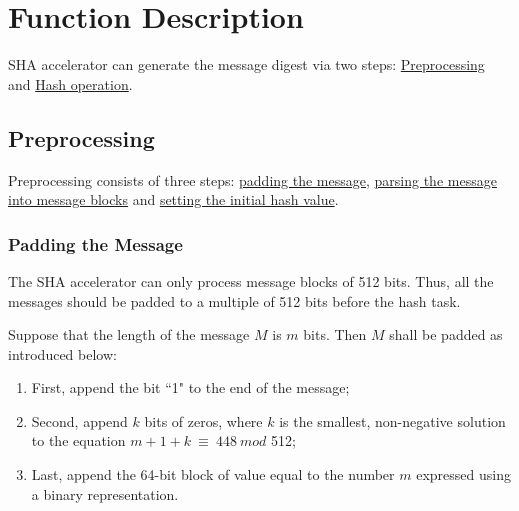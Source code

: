 \documentclass[main\_\_EN.tex]{subfiles}
\begin{document}
\section{Function Description}

SHA accelerator can generate the message digest via two steps: \hyperref[sec:sha-preprocessing]{Preprocessing} and  \hyperref[sec:sha-hash-operation]{Hash operation}.

\subsection{Preprocessing}\label{sec:sha-preprocessing}

Preprocessing consists of three steps: \hyperref[sec:sha-padding-msg]{padding the message}, \hyperref[sec:sha-parsing-msg]{parsing the message into message blocks} and \hyperref[sec:sha-set-initial-hash]{setting the initial hash value}.

\subsubsection{Padding the Message}\label{sec:sha-padding-msg}

The SHA accelerator can only process message blocks of 512 bits. Thus, all the messages should be padded to a multiple of 512 bits before the hash task.

Suppose that the length of the message \begin{math}M\end{math} is \begin{math} m \end{math} bits. Then \begin{math} M \end{math} shall be padded as introduced below:

\begin{enumerate}
    \item First, append the bit ``1" to the end of the message;
    \item Second, append \begin{math} k \end{math} bits of zeros, where \begin{math} k \end{math} is the smallest, non-negative solution to the equation \begin{math}m + 1 + k \ {\equiv} \ 448 \ mod \end{math} 512;
    \item Last, append the 64-bit block of value equal to the number \begin{math} m \end{math} expressed using a binary representation.
\end{enumerate}
\end{document}
